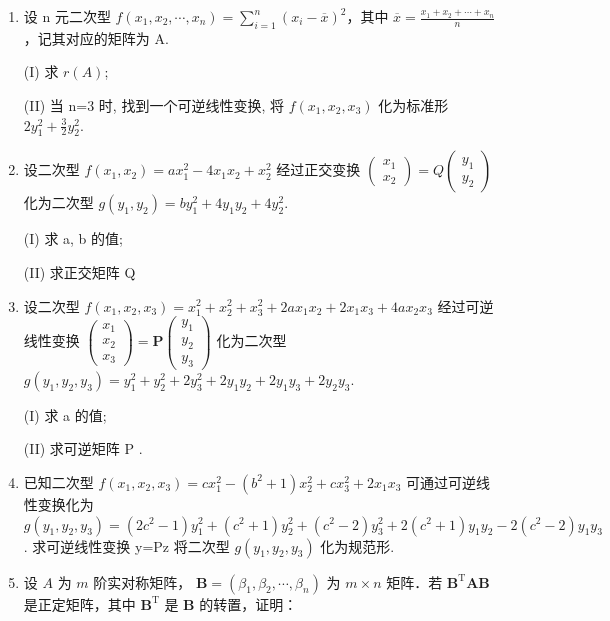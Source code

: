 \documentclass[12pt, a4paper]{ctexart}
\begin{document}
\begin{enumerate}[start=9]
    \item 设 n 元二次型 $ f(x_{1},x_{2},\cdots,x_{n})=\sum_{i=1}^{n}\left(x_{i}-\overline{x}\right)^{2} $，其中 $ \overline{x}=\frac{x_{1}+x_{2}+\cdots+x_{n}}{n} $，记其对应的矩阵为 A.
    
    (I) 求 $ r(A) $;
    
    (II) 当 n=3 时, 找到一个可逆线性变换, 将 $ f(x_{1}, x_{2}, x_{3}) $ 化为标准形 $ 2y_{1}^{2} + \frac{3}{2}y_{2}^{2} $.

    \item 设二次型 $ f(x_{1}, x_{2}) = ax_{1}^{2} - 4x_{1}x_{2} + x_{2}^{2} $ 经过正交变换 $ \begin{pmatrix} x_{1} \\ x_{2} \end{pmatrix} = Q \begin{pmatrix} y_{1} \\ y_{2} \end{pmatrix} $ 化为二次型 $ g(y_{1}, y_{2}) = by_{1}^{2} + 4y_{1}y_{2} + 4y_{2}^{2} $.
    
    (I) 求 a, b 的值;
    
    (II) 求正交矩阵 Q

    \item 设二次型 $ f(x_{1},x_{2},x_{3})=x_{1}^{2}+x_{2}^{2}+x_{3}^{2}+2ax_{1}x_{2}+2x_{1}x_{3}+4ax_{2}x_{3} $ 经过可逆线性变换 $ \begin{pmatrix} x_{1} \\ x_{2} \\ x_{3} \end{pmatrix}=\mathbf{P}\begin{pmatrix} y_{1} \\ y_{2} \\ y_{3} \end{pmatrix} $ 化为二次型 $ g(y_{1},y_{2},y_{3})=y_{1}^{2}+y_{2}^{2}+2y_{3}^{2}+2y_{1}y_{2}+2y_{1}y_{3}+2y_{2}y_{3} $.
    
    (I) 求 a 的值;
    
    (II) 求可逆矩阵 P .

    \item 已知二次型 $ f(x_{1},x_{2},x_{3})=cx_{1}^{2}-(b^{2}+1)x_{2}^{2}+cx_{3}^{2}+2x_{1}x_{3} $ 可通过可逆线性变换化为 $ g(y_{1},y_{2},y_{3})=(2c^{2}-1)y_{1}^{2}+(c^{2}+1)y_{2}^{2}+(c^{2}-2)y_{3}^{2}+2(c^{2}+1)y_{1}y_{2}-2(c^{2}-2)y_{1}y_{3} $. 求可逆线性变换 y=Pz 将二次型 $ g(y_{1},y_{2},y_{3}) $ 化为规范形.

    \item 设 $ A $ 为 $ m $ 阶实对称矩阵， $ \mathbf{B} = (\beta_1, \beta_2, \cdots, \beta_n) $ 为 $ m \times n $ 矩阵．若 $ \mathbf{B}^\mathrm{T} \mathbf{A} \mathbf{B} $ 是正定矩阵，其中 $ \mathbf{B}^\mathrm{T} $ 是 $ \mathbf{B} $ 的转置，证明：
    

\end{enumerate}
\end{document}
